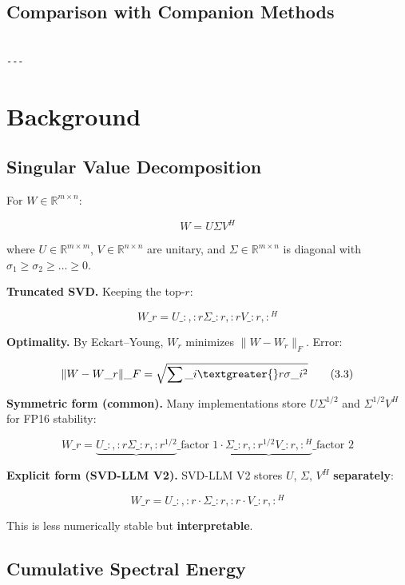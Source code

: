 \subsection{Comparison with Companion Methods}

\begin{lstlisting}

---
\end{lstlisting}


\section{Background}

\subsection{Singular Value Decomposition}

For $W \in \mathbb{R}^{m \times n}$:

\[
W = U \Sigma V^H
\tag{3.1}
\]

where $U \in \mathbb{R}^{m \times m}$, $V \in \mathbb{R}^{n \times n}$ are 
unitary, and $\Sigma \in \mathbb{R}^{m \times n}$ is diagonal with 
$\sigma_1 \geq \sigma_2 \geq \dots \geq 0$.

\textbf{Truncated SVD.} Keeping the top-$r$:

\[
W\_r = U\_{:, :r} \Sigma\_{:r, :r} V\_{:r, :}^H
\tag{3.2}
\]

\textbf{Optimality.} By Eckart--Young, $W_r$ minimizes $\|W - W_r\|_F$. Error:

\[
\|W - W\_r\|\_F = \sqrt{\sum\_{i \textgreater{} r} \sigma\_i^2}
\tag{3.3}
\]

\textbf{Symmetric form (common).} Many implementations store $U\Sigma^{1/2}$ and 
$\Sigma^{1/2}V^H$ for FP16 stability:

\[
W\_r = \underbrace{U\_{:, :r}\Sigma\_{:r, :r}^{1/2}}\_{\text{factor 1}} \cdot \underbrace{\Sigma\_{:r, :r}^{1/2}V\_{:r, :}^H}\_{\text{factor 2}}
\tag{3.4}
\]

\textbf{Explicit form (SVD-LLM V2).} SVD-LLM V2 stores $U$, $\Sigma$, $V^H$ 
\textbf{separately}:

\[
W\_r = U\_{:, :r} \cdot \Sigma\_{:r, :r} \cdot V\_{:r, :}^H
\tag{3.5}
\]

This is less numerically stable but \textbf{interpretable}.

\subsection{Cumulative Spectral Energy}

